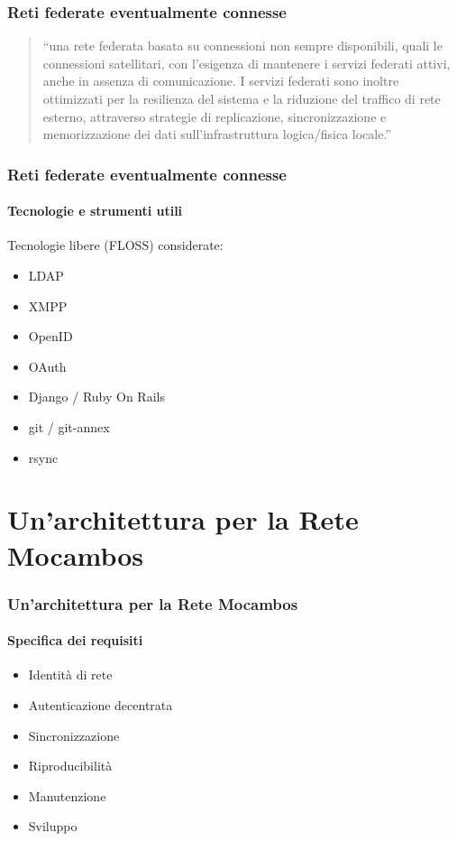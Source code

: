 \documentclass{beamer}
\begin{document}
{\begin{frame}
  \frametitle{Reti federate eventualmente connesse}
  \begin{quote}
    ``una rete federata basata su connessioni non sempre disponibili,
    quali le connessioni satellitari, con l'esigenza di mantenere i
    servizi federati attivi, anche in assenza di comunicazione. I
    servizi federati sono inoltre ottimizzati per la resilienza del
    sistema e la riduzione del traffico di rete esterno, attraverso
    strategie di replicazione, sincronizzazione e memorizzazione dei
    dati sull'infrastruttura logica/fisica locale.''
    \end{quote}
\end{frame}


{
\begin{frame}
  \frametitle{Reti federate eventualmente connesse}
  \framesubtitle{Tecnologie e strumenti utili}
  Tecnologie libere (FLOSS) considerate:
  \begin{itemize}
    \item LDAP
    \item XMPP
    \item OpenID
    \item OAuth
    \item Django / Ruby On Rails
    \item git / git-annex
    \item rsync
    \end{itemize}
\end{frame}
}


\section{Un'architettura per la Rete Mocambos}

\begin{frame}
  \frametitle{Un'architettura per la Rete Mocambos}
  \framesubtitle{Specifica dei requisiti}
  \begin{itemize}
    \item Identità di rete
    \item Autenticazione decentrata
    \item Sincronizzazione
    \item Riproducibilità
    \item Manutenzione
    \item Sviluppo
    \end{itemize}


\end{frame}}
\end{document}
